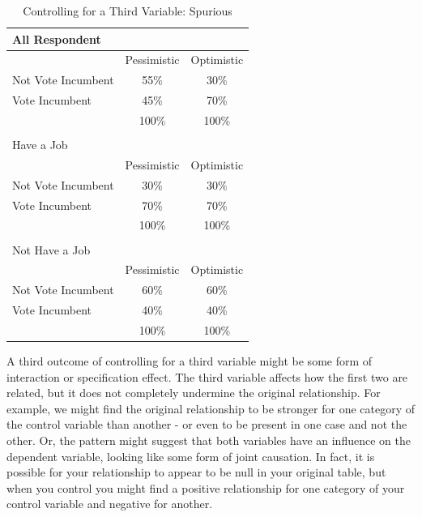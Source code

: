 \documentclass[11pt,openany]{book}\usepackage[]{graphicx}\usepackage[]{color}
\begin{document}
\begin{table}[h]
\centering
\caption{Controlling for a Third Variable: Spurious} \label{tab:TableWithControl2}
\begin{tabular}{lcc}
\hline
\multicolumn{1}{|l|}{All Respondent} & \multicolumn{1}{c|}{} & \multicolumn{1}{c|}{} \\ \hline
\multicolumn{1}{|l|}{} & \multicolumn{1}{c|}{Pessimistic} & \multicolumn{1}{c|}{Optimistic} \\ \hline
\multicolumn{1}{|l|}{Not Vote Incumbent} & \multicolumn{1}{c|}{55\%} & \multicolumn{1}{c|}{30\%} \\ \hline
\multicolumn{1}{|l|}{Vote Incumbent} & \multicolumn{1}{c|}{45\%} & \multicolumn{1}{c|}{70\%} \\ \hline
\multicolumn{1}{|l|}{} & \multicolumn{1}{c|}{100\%} & \multicolumn{1}{c|}{100\%} \\ \hline
 &  &  \\ \hline
\multicolumn{1}{|l|}{Have a Job} & \multicolumn{1}{c|}{} & \multicolumn{1}{c|}{} \\ \hline
\multicolumn{1}{|l|}{} & \multicolumn{1}{c|}{Pessimistic} & \multicolumn{1}{c|}{Optimistic} \\ \hline
\multicolumn{1}{|l|}{Not Vote Incumbent} & \multicolumn{1}{c|}{30\%} & \multicolumn{1}{c|}{30\%} \\ \hline
\multicolumn{1}{|l|}{Vote Incumbent} & \multicolumn{1}{c|}{70\%} & \multicolumn{1}{c|}{70\%} \\ \hline
\multicolumn{1}{|l|}{} & \multicolumn{1}{c|}{100\%} & \multicolumn{1}{c|}{100\%} \\ \hline
 &  &  \\ \hline
\multicolumn{1}{|l|}{Not Have a Job} & \multicolumn{1}{c|}{} & \multicolumn{1}{c|}{} \\ \hline
\multicolumn{1}{|l|}{} & \multicolumn{1}{c|}{Pessimistic} & \multicolumn{1}{c|}{Optimistic} \\ \hline
\multicolumn{1}{|l|}{Not Vote Incumbent} & \multicolumn{1}{c|}{60\%} & \multicolumn{1}{c|}{60\%} \\ \hline
\multicolumn{1}{|l|}{Vote Incumbent} & \multicolumn{1}{c|}{40\%} & \multicolumn{1}{c|}{40\%} \\ \hline
\multicolumn{1}{|l|}{} & \multicolumn{1}{c|}{100\%} & \multicolumn{1}{c|}{100\%} \\ \hline
\end{tabular}
\end{table}

A third outcome of controlling for a third variable might be some form of interaction or specification effect.  The third variable affects how the first two are related, but it does not completely undermine the original relationship.  For example, we might find the original relationship to be stronger for one category of the control variable than another - or even to be present in one case and not the other.   Or, the pattern might suggest that both variables have an influence on the dependent variable, looking like some form of joint causation.  In fact, it is possible for your relationship to appear to be null in your original table, but when you control you might find a positive relationship for one category of your control variable and negative for another.   
\end{document}

